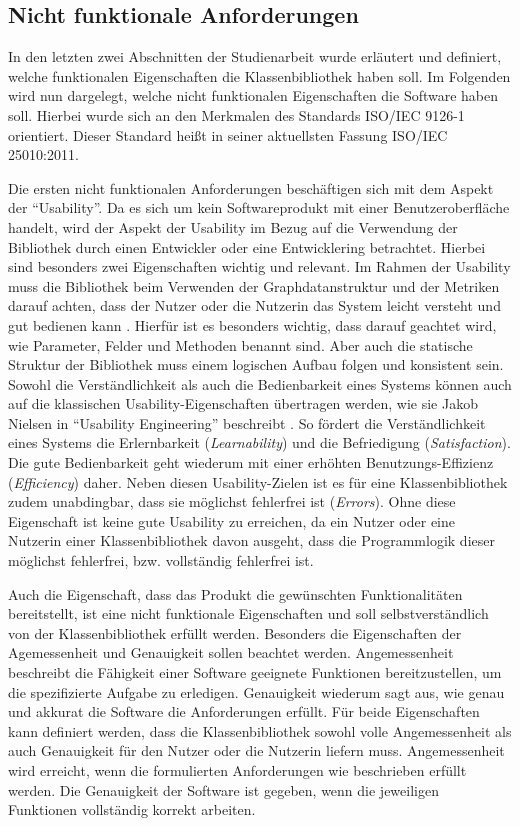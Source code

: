 \documentclass[a4paper,12pt,ngerman,chapterprefix=false,listof=totoc,bibliography=totoc]{scrreprt}
\begin{document}
{{\subsection{Nicht funktionale Anforderungen}
{
In den letzten zwei Abschnitten der Studienarbeit wurde erläutert und definiert, welche funktionalen Eigenschaften die Klassenbibliothek haben soll. Im Folgenden wird nun dargelegt, welche nicht funktionalen Eigenschaften die Software haben soll. Hierbei wurde sich an den Merkmalen des Standards ISO/IEC 9126-1 orientiert. \cite{balzert_lehrbuch_2009} Dieser Standard heißt in seiner aktuellsten Fassung ISO/IEC 25010:2011.

Die ersten nicht funktionalen Anforderungen beschäftigen sich mit dem Aspekt der "`Usability"'. Da es sich um kein Softwareprodukt mit einer Benutzeroberfläche handelt, wird der Aspekt der Usability im Bezug auf die Verwendung der Bibliothek durch einen Entwickler oder eine Entwicklering betrachtet. Hierbei sind besonders zwei Eigenschaften wichtig und relevant. Im Rahmen der Usability muss die Bibliothek beim Verwenden der Graphdatanstruktur und der Metriken darauf achten, dass der Nutzer oder die Nutzerin das System leicht versteht und gut bedienen kann \cite{balzert_lehrbuch_2009}. Hierfür ist es besonders wichtig, dass darauf geachtet wird, wie Parameter, Felder und Methoden benannt sind. Aber auch die statische Struktur der Bibliothek muss einem logischen Aufbau folgen und konsistent sein. Sowohl die Verständlichkeit als auch die Bedienbarkeit eines Systems können auch auf die klassischen Usability-Eigenschaften übertragen werden, wie sie Jakob Nielsen in "`Usability Engineering"' beschreibt \cite{nielsen_usability_2010}. So fördert die Verständlichkeit eines Systems die Erlernbarkeit (\textit{Learnability}) und die Befriedigung (\textit{Satisfaction}). Die gute Bedienbarkeit geht wiederum mit einer erhöhten Benutzungs-Effizienz (\textit{Efficiency}) daher. Neben diesen Usability-Zielen ist es für eine Klassenbibliothek zudem unabdingbar, dass sie möglichst fehlerfrei ist (\textit{Errors}). Ohne diese Eigenschaft ist keine gute Usability zu erreichen, da ein Nutzer oder eine Nutzerin einer Klassenbibliothek davon ausgeht, dass die Programmlogik dieser möglichst fehlerfrei, bzw. vollständig fehlerfrei ist.

Auch die Eigenschaft, dass das Produkt die gewünschten Funktionalitäten bereitstellt, ist eine nicht funktionale Eigenschaften und soll selbstverständlich von der Klassenbibliothek erfüllt werden. Besonders die Eigenschaften der Agemessenheit und Genauigkeit sollen beachtet werden. Angemessenheit beschreibt die Fähigkeit einer Software geeignete Funktionen bereitzustellen, um die spezifizierte Aufgabe zu erledigen. Genauigkeit wiederum sagt aus, wie genau und akkurat die Software die Anforderungen erfüllt. Für beide Eigenschaften kann definiert werden, dass die Klassenbibliothek sowohl volle Angemessenheit als auch Genauigkeit für den Nutzer oder die Nutzerin liefern muss. Angemessenheit wird erreicht, wenn die formulierten Anforderungen wie beschrieben erfüllt werden. Die Genauigkeit der Software ist gegeben, wenn die jeweiligen Funktionen vollständig korrekt arbeiten.

}}}
\end{document}

